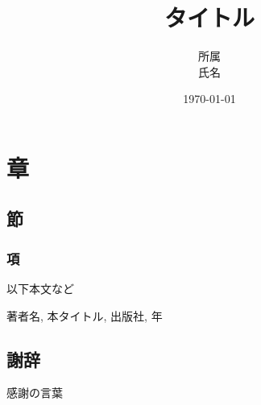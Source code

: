 \documentclass[a4paper,12pt,uplatex]{jsreport}
\title{タイトル}
\author{所属\\氏名}
\date{\today}
\begin{document}
\maketitle
\tableofcontents

\chapter{章}
\section{節}
\subsection{項}
以下本文など

\newpage
\begin{thebibliography}{999}
	\item 著者名, 本タイトル, 出版社, 年
\end{thebibliography}

\newpage
\section*{謝辞}
感謝の言葉
\end{document}
